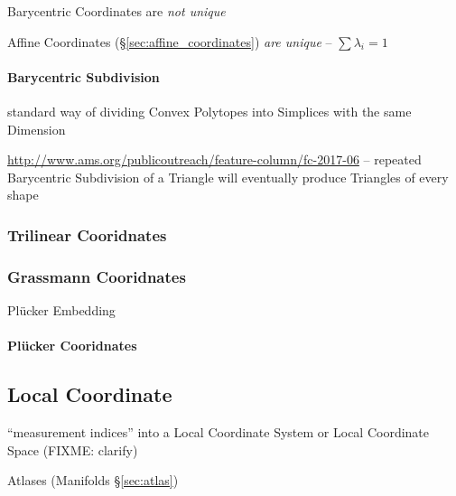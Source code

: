 Barycentric Coordinates are \emph{not unique}

Affine Coordinates (\S\ref{sec:affine_coordinates}) \emph{are unique} --
$\sum \lambda_i = 1$



\paragraph{Barycentric Subdivision}\label{sec:barycentric_subdivision}\hfill

standard way of dividing Convex Polytopes into Simplices with the same Dimension

\url{http://www.ams.org/publicoutreach/feature-column/fc-2017-06} -- repeated
Barycentric Subdivision of a Triangle will eventually produce Triangles of every
shape



\subsubsection{Trilinear Cooridnates}\label{sec:trilinear_coordinates}

\subsubsection{Grassmann Cooridnates}\label{sec:grassmann_coordinates}

Pl\"ucker Embedding



\paragraph{Pl\"ucker Cooridnates}\label{sec:plucker_coordinates}\hfill



\subsection{Local Coordinate}\label{sec:local_coordinate}

``measurement indices'' into a Local Coordinate System or Local Coordinate Space
(FIXME: clarify)

\fist Atlases (Manifolds \S\ref{sec:atlas})



